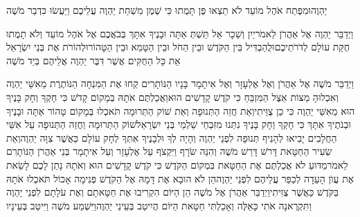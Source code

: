 \documentclass[../main/main.tex]{subfiles}
\begin{document}
\begin{multicols*}{\ncols}
יַהְוֶה\PreVerseSpace{}וּמִפֶּתַח אֹהֶל מוֹעֵד לֹא תֵצְאוּ פֶּן תָּמֻתוּ כִּי שֶׁמֶן מִשְׁחַת יַהְוֶה עֲלֵיכֶם וַיַּעֲשׂוּ כִּדְבַר מֹשֶׁה\OpenSection{}\par
{}וַיְדַבֵּר יַהְוֶה אֶל אַהֲרֹן לֵאמֹר\PreVerseSpace{}יַיִן וְשֵׁכָר אַל תֵּשְׁתְּ אַתָּה וּבָנֶיךָ אִתָּךְ בְּבֹאֲכֶם אֶל אֹהֶל מוֹעֵד וְלֹא תָמֻתוּ חֻקַּת עוֹלָם לְדֹרֹתֵיכֶם\PreVerseSpace{}וּלֲהַבְדִּיל בֵּין הַקֹּדֶשׁ וּבֵין הַחֹל וּבֵין הַטָּמֵא וּבֵין הַטָּהוֹר\PreVerseSpace{}וּלְהוֹרֹת אֶת בְּנֵי יִשְׂרָאֵל אֵת כָּל הַחֻקִּים אֲשֶׁר דִּבֶּר יַהְוֶה אֲלֵיהֶם בְּיַד מֹשֶׁה\OpenSection{}\par
{}וַיְדַבֵּר מֹשֶׁה אֶל אַהֲרֹן וְאֶל אֶלְעָזָר וְאֶל אִיתָמָר בָּנָיו הַנּוֹתָרִים קְחוּ אֶת הַמִּנְחָה הַנּוֹתֶרֶת מֵאִשֵּׁי יַהְוֶה וְאִכְלוּהָ מַצּוֹת אֵצֶל הַמִּזְבֵּחַ כִּי קֹדֶשׁ קָדָשִׁים הוּא\PreVerseSpace{}וַאֲכַלְתֶּם אֹתָהּ בְּמָקוֹם קָדֹשׁ כִּי חָקְךָ וְחָק בָּנֶיךָ הוּא מֵאִשֵּׁי יַהְוֶה כִּי כֵן צֻוֵּיתִי\PreVerseSpace{}וְאֵת חֲזֵה הַתְּנוּפָה וְאֵת שׁוֹק הַתְּרוּמָה תֹּאכְלוּ בְּמָקוֹם טָהוֹר אַתָּה וּבָנֶיךָ וּבְנֹתֶיךָ אִתָּךְ כִּי חָקְךָ וְחָק בָּנֶיךָ נִתְּנוּ מִזִּבְחֵי שַׁלְמֵי בְּנֵי יִשְׂרָאֵל\PreVerseSpace{}שׁוֹק הַתְּרוּמָה וַחֲזֵה הַתְּנוּפָה עַל אִשֵּׁי הַחֲלָבִים יָבִיאוּ לְהָנִיף תְּנוּפָה לִפְנֵי יַהְוֶה וְהָיָה לְךָ וּלְבָנֶיךָ אִתְּךָ לְחָק עוֹלָם כַּאֲשֶׁר צִוָּה יַהְוֶה\PreVerseSpace{}וְאֵת שְׂעִיר הַחַטָּאת דָּרֹשׁ דָּרַשׁ מֹשֶׁה וְהִנֵּה שֹׂרָף וַיִּקְצֹף עַל אֶלְעָזָר וְעַל אִיתָמָר בְּנֵי אַהֲרֹן הַנּוֹתָרִם לֵאמֹר\PreVerseSpace{}מַדּוּעַ לֹא אֲכַלְתֶּם אֶת הַחַטָּאת בִּמְקוֹם הַקֹּדֶשׁ כִּי קֹדֶשׁ קָדָשִׁים הוּא וְאֹתָהּ נָתַן לָכֶם לָשֵׂאת אֶת עֲוֺן הָעֵדָה לְכַפֵּר עֲלֵיהֶם לִפְנֵי יַהְוֶה\PreVerseSpace{}הֵן לֹא הוּבָא אֶת דָּמָהּ אֶל הַקֹּדֶשׁ פְּנִימָה אָכוֹל תֹּאכְלוּ אֹתָהּ בַּקֹּדֶשׁ כַּאֲשֶׁר צֻוִּיתִי\SubEnd{}\PreVerseSpace{}וַיְדַבֵּר אַהֲרֹן אֶל מֹשֶׁה הֵן הַיּוֹם הִקְרִיבוּ אֶת חַטָּאתָם וְאֶת עֹלָתָם לִפְנֵי יַהְוֶה וַתִּקְרֶאנָה אֹתִי כָּאֵלֶּה וְאָכַלְתִּי חַטָּאת הַיּוֹם הֲיִיטַב\SubEnd{} בְּעֵינֵי יַהְוֶה\PreVerseSpace{}וַיִּשְׁמַע מֹשֶׁה וַיִּיטַב בְּעֵינָיו\OpenSection{}\par

\end{multicols*}
\end{document}
